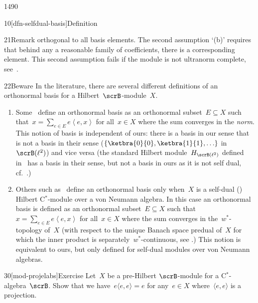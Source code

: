 \begin{parsec}{1490}
\begin{point}{10}[dfn-selfdual-basis]{Definition}
\begin{point}{21}{Remark}
    orthogonal to all basis elements.
The second assumption `(b)' requires that behind
    any a reasonable family of coefficients,
    there is a corresponding element.
This second assumption fails if the module is not ultranorm complete,
    see~.
\end{point}
\begin{point}{22}{Beware}%
In the literature, there are several different definitions of an
    orthonormal basis
    for a Hilbert~$\scrB$-module~$X$.
\begin{enumerate}
\item
Some~\cite{landi2012orthogonal,manuilov2000hilbertc}
    define an orthonormal basis as an orthonormal subset~$E \subseteq X$
        such that~$x = \sum_{e \in E} e \left<e, x\right>$
    for all~$x \in X$
    where the sum converges in the \emph{norm}.
This notion of basis is independent of ours:
        there is a basis in our sense
         that is not a basis
        in their sense ($\{ \ketbra{0}{0}, \ketbra{1}{1}, \ldots\}$
        in~$\scrB(\ell^2)$)
        and vice versa (the standard Hilbert module~$H_{\scrB(\ell^2)}$
            defined in~\cite[\S3]{landi2012orthogonal} has a basis
            in their sense, but not a basis in ours
            as it is not self dual, cf.~.)
\item
Others such as~\cite[lemma~8.5.23]{blecher2004operator}
    define an orthonormal basis
        only when~$X$ is a self-dual ()
        Hilbert C$^*$-module
            over a von Neumann algebra.
    In this case an orthonormal basis
        is defined
        as an orthonormal subset~$E \subseteq X$
    such that~$x = \sum_{e \in E} e \left<e, x \right>$
        for all~$x \in X$
        where the sum converges in the~$w^*$-topology of~$X$
        (with respect to the unique Banach space predual
    of~$X$ for which the inner product is
    separately~$w^*$-continuous,
        see \cite[lemma 8.5.4]{blecher2004operator}.)
This notion is equivalent to ours, but only defined
    for self-dual modules over von Neumann algebras.
\end{enumerate}
\spacingfix{}
\end{point}
\end{point}
\begin{point}{30}[mod-projelabs]{Exercise}%
Let~$X$ be a pre-Hilbert $\scrB$-module for a C$^*$-algebra~$\scrB$.
Show that we have~$ e \langle e,e \rangle = e$
    for any~$e \in X$
   where~$\langle e, e\rangle$ is a projection.


\end{point}
\end{parsec}
